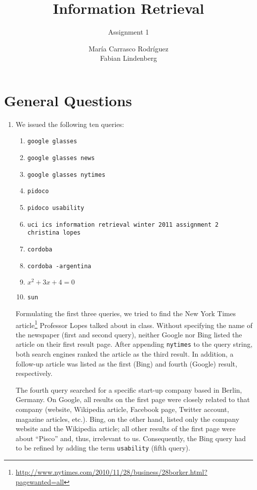\documentclass[a4paper,11pt,oneside]{book}
\title{Information Retrieval }
\subtitle{Assignment 1}
\author{ María Carrasco Rodríguez \\
		Fabian Lindenberg}
\begin{document}
\kostspieligmaketitle

\tableofcontents
\pagebreak

\chapter{General Questions}

\begin{enumerate}\item We issued the following ten queries:
				\begin{enumerate}
					\renewcommand{\labelenumii}{\Roman{enumii}}
					\item \texttt{google glasses}
					\item \texttt{google glasses news}
					\item \texttt{google glasses nytimes}
					\item \texttt{pidoco}
					\item \texttt{pidoco usability}
					\item \texttt{uci ics information retrieval winter 2011 assignment 2 christina lopes}
					\item \texttt{cordoba}
					\item \texttt{cordoba -argentina}
					\item $x^2 + 3x + 4 = 0$
					\item \texttt{sun}
				\end{enumerate}
				Formulating the first three queries, we tried to find the New York Times article\footnote{\url{http://www.nytimes.com/2010/11/28/business/28borker.html?pagewanted=all}} Professor Lopes talked about in class. Without specifying the name of the newspaper (first and second query), neither Google nor Bing listed the article on their first result page. After appending \texttt{nytimes} to the query string, both search engines ranked the article as the third result. In addition, a follow-up article was listed as the first (Bing) and fourth (Google) result, respectively.
				
				The fourth query searched for a specific start-up company based in Berlin, Germany. On Google, all results on the first page were closely related to that company (website, Wikipedia article, Facebook page, Twitter account, magazine articles, etc.). Bing, on the other hand, listed only the company website and the Wikipedia article; all other results of the first page were about ``Pisco'' and, thus, irrelevant to us. Consequently, the Bing query had to be refined by adding the term \texttt{usability} (fifth query).
				

\end{enumerate}
\end{document}
